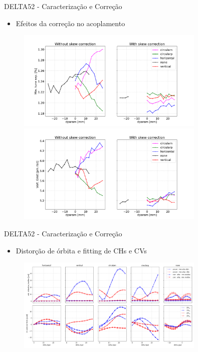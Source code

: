 \documentclass{beamer}					  %
\begin{document}
\begin{frame}{DELTA52 - Caracterização e Correção}
    \begin{itemize}
    		\item Efeitos da correção no acoplamento
    \end{itemize}
    \begin{figure}[H]
        	\centering
            \includegraphics[width=0.8\textwidth]{2023-12-12/figures/coupling.png}\\ 
            
            \includegraphics[width=0.8\textwidth]{2023-12-12/figures/Vertical_emmitance.png}
            \label{fig:bba}
    \end{figure} 
\end{frame}


\begin{frame}{DELTA52 - Caracterização e Correção}
    \begin{itemize}
    		\item Distorção de órbita e fitting de CHs e CVs
    \end{itemize}
    \begin{figure}[H]
        	\centering
            \includegraphics[width=0.8\textwidth]{2023-12-12/figures/cod-fit.png}
            \label{fig:bba}
    \end{figure} 
\end{frame}
\end{document}
